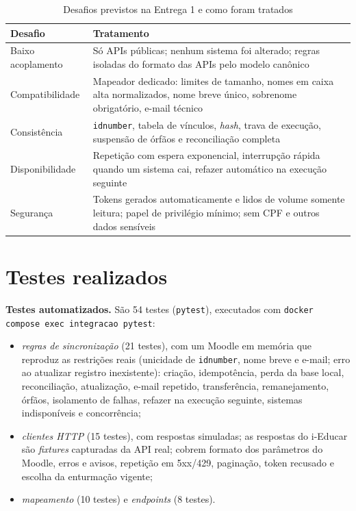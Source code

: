 \documentclass[12pt]{article}
\newcommand{\cod}[1]{\texttt{#1}}
\begin{document}
\begin{table}[H]
\centering
\caption{Desafios previstos na Entrega 1 e como foram tratados}
\label{tab:desafios}
\footnotesize
\begin{tabularx}{\linewidth}{>{\raggedright\arraybackslash}p{2.6cm}>{\raggedright\arraybackslash}X}
\toprule
\textbf{Desafio} & \textbf{Tratamento} \\
\midrule
Baixo acoplamento & Só APIs públicas; nenhum sistema foi alterado; regras isoladas do formato das APIs pelo modelo canônico \\
Compatibilidade & Mapeador dedicado: limites de tamanho, nomes em caixa alta normalizados, nome breve único, sobrenome obrigatório, e-mail técnico \\
Consistência & \cod{idnumber}, tabela de vínculos, \emph{hash}, trava de execução, suspensão de órfãos e reconciliação completa \\
Disponibilidade & Repetição com espera exponencial, interrupção rápida quando um sistema cai, refazer automático na execução seguinte \\
Segurança & Tokens gerados automaticamente e lidos de volume somente leitura; papel de privilégio mínimo; sem CPF e outros dados sensíveis \\
\bottomrule
\end{tabularx}
\end{table}

\section{Testes realizados}

\textbf{Testes automatizados.} São 54 testes (\cod{pytest}), executados com
\cod{docker compose exec integracao pytest}:
\begin{itemize}
  \item \emph{regras de sincronização} (21 testes), com um Moodle em memória que
    reproduz as restrições reais (unicidade de \cod{idnumber}, nome breve e
    e-mail; erro ao atualizar registro inexistente): criação, idempotência,
    perda da base local, reconciliação, atualização, e-mail repetido,
    transferência, remanejamento, órfãos, isolamento de falhas, refazer na
    execução seguinte, sistemas indisponíveis e concorrência;
  \item \emph{clientes HTTP} (15 testes), com respostas simuladas; as respostas do
    i-Educar são \emph{fixtures} capturadas da API real; cobrem formato dos
    parâmetros do Moodle, erros e avisos, repetição em 5xx/429, paginação,
    token recusado e escolha da enturmação vigente;
  \item \emph{mapeamento} (10 testes) e \emph{endpoints} (8 testes).
\end{itemize}
\end{document}
